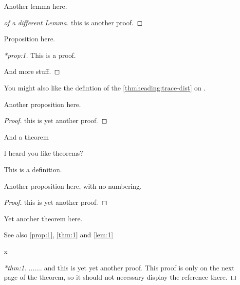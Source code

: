 \documentclass[12pt,a5paper]{article}
\begin{document}
\begin{lemma}
\label{lem:1}
Another lemma here.
\end{lemma}
\begin{proof}[of a different Lemma]
  this is another proof.
\end{proof}


\begin{proposition}
  \label{prop:1}
  Proposition here.
\end{proposition}
\begin{proof}[*prop:1]
  This is a proof.

  And more stuff.
\end{proof}


You might also like the defintion of the \ref{thmheading:trace-dist} on .

\begin{proposition}
\noproofref
Another proposition here.
\end{proposition}
\begin{proof}
  this is yet another proof.
\end{proof}


\begin{theorem}
\label{thm:1}
And a theorem
\end{theorem}


\begin{theorem}
\noproofref
\label{thm:2}
I heard you like theorems?
\end{theorem}

\begin{definition*}
\label{def:1}
This is a definition.
\end{definition*}


\begin{proposition*}
Another proposition here, with no numbering.
\end{proposition*}
\begin{proof}
  this is yet another proof.
\end{proof}

\begin{theorem}
  \label{thm:another}
  Yet another theorem here.
\end{theorem}


See also \autoref{prop:1}, \autoref{thm:1} and \autoref{lem:1}

\cleardoublepage
x
\begin{proof}[*thm:1]
  ....... and this is yet yet another proof.  This proof is only on the next page of the
  theorem, so it should not necessary display the reference there.
\end{proof}
\end{document}
